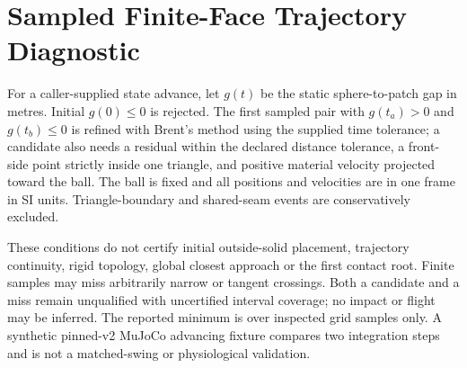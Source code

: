 \documentclass{article}
\begin{document}
\section{Sampled Finite-Face Trajectory Diagnostic}
For a caller-supplied state advance, let $g(t)$ be the static sphere-to-patch
gap in metres. Initial $g(0)\leq0$ is rejected. The first sampled pair with
$g(t_a)>0$ and $g(t_b)\leq0$ is refined with Brent's method using the supplied
time tolerance; a candidate also needs a residual within the declared distance
tolerance, a front-side point strictly inside one triangle, and positive
material velocity projected toward the ball. The ball is fixed and all
positions and velocities are in one frame in SI units. Triangle-boundary and
shared-seam events are conservatively excluded.

These conditions do not certify initial outside-solid placement, trajectory
continuity, rigid topology, global closest approach or the first contact root.
Finite samples may miss arbitrarily narrow or tangent crossings. Both a
candidate and a miss remain unqualified with uncertified interval coverage; no
impact or flight may be inferred. The reported minimum is over inspected grid
samples only. A synthetic pinned-v2 MuJoCo advancing fixture compares two
integration steps and is not a matched-swing or physiological validation.
\end{document}
